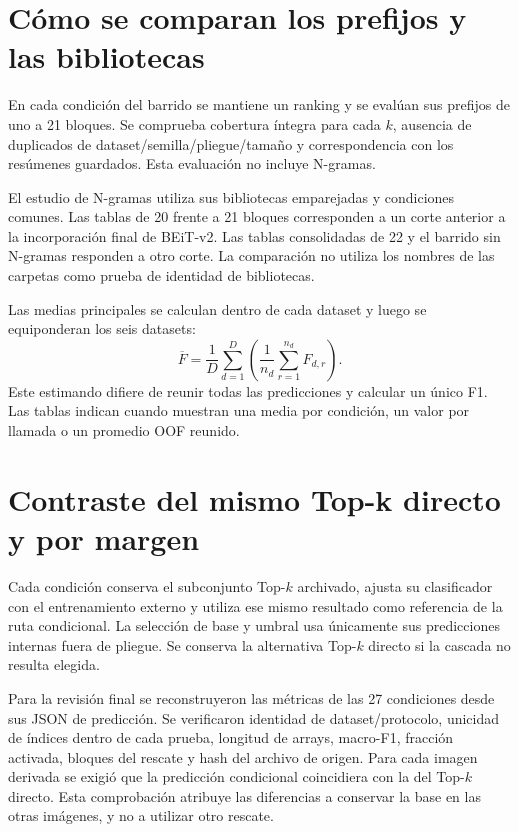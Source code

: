 \section{Cómo se comparan los prefijos y las bibliotecas}
En cada condición del barrido se mantiene un ranking y se evalúan sus prefijos de uno a 21 bloques. Se comprueba cobertura íntegra para cada \(k\), ausencia de duplicados de dataset/semilla/pliegue/tamaño y correspondencia con los resúmenes guardados. Esta evaluación no incluye N-gramas.

El estudio de N-gramas utiliza sus bibliotecas emparejadas y condiciones comunes. Las tablas de 20 frente a 21 bloques corresponden a un corte anterior a la incorporación final de BEiT-v2. Las tablas consolidadas de 22 y el barrido sin N-gramas responden a otro corte. La comparación no utiliza los nombres de las carpetas como prueba de identidad de bibliotecas.

Las medias principales se calculan dentro de cada dataset y luego se equiponderan los seis datasets:
\begin{equation}
\overline F=\frac{1}{D}\sum_{d=1}^{D}
\left(\frac{1}{n_d}\sum_{r=1}^{n_d}F_{d,r}\right).
\label{eq:tk-aggregation}
\end{equation}
Este estimando difiere de reunir todas las predicciones y calcular un único F1. Las tablas indican cuando muestran una media por condición, un valor por llamada o un promedio OOF reunido.

\section{Contraste del mismo Top-k directo y por margen}
Cada condición conserva el subconjunto Top-\(k\) archivado, ajusta su clasificador con el entrenamiento externo y utiliza ese mismo resultado como referencia de la ruta condicional. La selección de base y umbral usa únicamente sus predicciones internas fuera de pliegue. Se conserva la alternativa Top-\(k\) directo si la cascada no resulta elegida.

Para la revisión final se reconstruyeron las métricas de las 27 condiciones desde sus JSON de predicción. Se verificaron identidad de dataset/protocolo, unicidad de índices dentro de cada prueba, longitud de arrays, macro-F1, fracción activada, bloques del rescate y hash del archivo de origen. Para cada imagen derivada se exigió que la predicción condicional coincidiera con la del Top-\(k\) directo. Esta comprobación atribuye las diferencias a conservar la base en las otras imágenes, y no a utilizar otro rescate.

